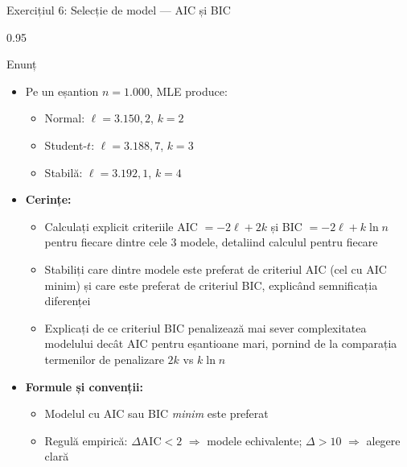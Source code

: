 \documentclass[9pt, aspectratio=169, t]{beamer}
\begin{document}
\begin{frame}[shrink=25]{Exercițiul 6: Selecție de model --- AIC și BIC}
\begin{cminipage}{0.95\textwidth}
\begin{block}{Enunț}
\begin{itemize}\setlength{\itemsep}{0pt}
    \item Pe un eșantion $n = 1.000$, MLE produce:
    \begin{itemize}\setlength{\itemsep}{0pt}
        \item Normal: $\ell = 3.150{,}2$, $k = 2$
        \item Student-$t$: $\ell = 3.188{,}7$, $k = 3$
        \item Stabilă: $\ell = 3.192{,}1$, $k = 4$
    \end{itemize}
    \item \textbf{Cerințe:}
    \begin{itemize}\setlength{\itemsep}{0pt}
        \item Calculați explicit criteriile AIC $= -2\ell + 2k$ și BIC $= -2\ell + k\ln n$ pentru fiecare dintre cele 3 modele, detaliind calculul pentru fiecare
        \item Stabiliți care dintre modele este preferat de criteriul AIC (cel cu AIC minim) și care este preferat de criteriul BIC, explicând semnificația diferenței
        \item Explicați de ce criteriul BIC penalizează mai sever complexitatea modelului decât AIC pentru eșantioane mari, pornind de la comparația termenilor de penalizare $2k$ vs $k \ln n$
    \end{itemize}
    \item \textbf{Formule și convenții:}
    \begin{itemize}\setlength{\itemsep}{0pt}
        \item Modelul cu AIC sau BIC \textit{minim} este preferat
        \item Regulă empirică: $\Delta\text{AIC} < 2$ $\Rightarrow$ modele echivalente; $\Delta > 10$ $\Rightarrow$ alegere clară
    \end{itemize}
\end{itemize}
\end{block}
\end{cminipage}
\end{frame}
\end{document}
